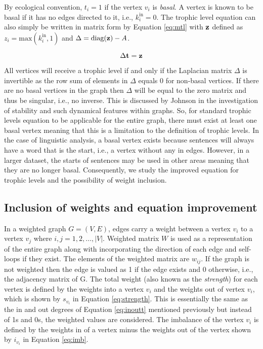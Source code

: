 By ecological convention, $t_i = 1$ if the vertex $v_i$ is \emph{basal}. A vertex is known to be basal if it has no edges directed to it, i.e., $k_i^{\text{in}} = 0$. The trophic level equation can also simply be written in matrix form by Equation \ref{eq:mtl} with $\bold{z}$ defined as $z_i = \text{max}(k_i^{\text{in}},1)$ and $\Delta = \text{diag}(\bold{z}) - A$.

\begin{equation} \label{eq:mtl}
\Delta\bold{t} = \bold{z} 
\end{equation}

All vertices will receive a trophic level if and only if the Laplacian matrix $\Delta$ is invertible as the row sum of elements in $\Delta$ equals 0 for non-basal vertices. If there are no basal vertices in the graph then $\Delta$ will be equal to the zero matrix and thus be singular, i.e., no inverse. This is discussed by Johnson \cite{johnson2020digraphs} in the investigation of stability and such dynamical features within graphs. So, for standard trophic levels equation to be applicable for the entire graph, there must exist at least one basal vertex meaning that this is a limitation to the definition of trophic levels. In the case of linguistic analysis, a basal vertex exists because sentences will always have a word that is the start, i.e., a vertex without any in edges. However, in a larger dataset, the starts of sentences may be used in other areas meaning that they are no longer basal. Consequently, we study the improved equation for trophic levels and the possibility of weight inclusion. 

\subsection{Inclusion of weights and equation improvement}
In a weighted graph $G = (V, E)$, edges carry a weight between a vertex $v_i$ to a vertex $v_j$ where $i , j = 1 , 2, \dots , \lvert V \rvert$. Weighted matrix $W$ is used as a representation of the entire graph along with incorporating the direction of each edge and self-loops if they exist. The elements of the weighted matrix are $w_{ij}$. If the graph is not weighted then the edge is valued as 1 if the edge exists and 0 otherwise, i.e., the adjacency matrix of G. The total weight (also known as the \emph{strength}) for each vertex is defined by the weights into a vertex $v_i$ and the weights out of vertex $v_i$, which is shown by $s_{v_i}$ in Equation \ref{eq:strength}. This is essentially the same as the in and out degrees of Equation \ref{eq:inoutt} mentioned previously but instead of 1s and 0s, the weighted values are considered. The imbalance of the vertex $v_i$ is defined by the weights in of a vertex minus the weights out of the vertex shown by $i_{v_i}$ in Equation \ref{eq:imb}.

